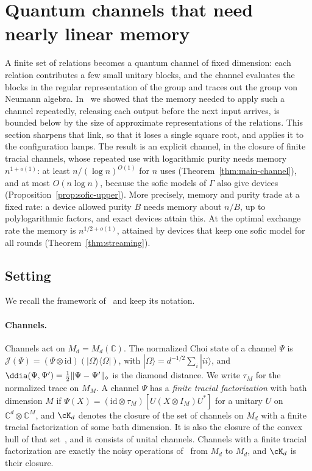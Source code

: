 \section{Quantum channels that need nearly linear memory}\label{sec:channel}

A finite set of relations becomes a quantum channel of fixed dimension: each relation contributes a few small unitary blocks, and the channel
evaluates the blocks in the regular representation of the group and traces out the group von Neumann algebra. In~\cite{DouglasMghirbiB} we showed
that the memory needed to apply such a channel repeatedly, releasing each output before the next input arrives, is bounded below by the size of
approximate representations of the relations. This section sharpens that link, so that it loses a single square root, and applies it to the
configuration lamps. The result is an explicit channel, in the closure of finite tracial channels, whose repeated use with logarithmic purity
needs memory $n^{1+o(1)}$: at least $n/(\log n)^{O(1)}$ for $n$ uses (Theorem~\ref{thm:main-channel}), and at most $O(n\log n)$, because the sofic
models of $\Gamma$ also give devices (Proposition~\ref{prop:sofic-upper}). More precisely, memory and purity trade at a fixed rate: a device
allowed purity $B$ needs memory about $n/B$, up to polylogarithmic factors, and exact devices attain this. At the optimal exchange rate the memory
is $n^{1/2+o(1)}$, attained by devices that keep one sofic model for all rounds (Theorem~\ref{thm:streaming}).

\subsection{Setting}\label{sec:channel-setting}

We recall the framework of~\cite{DouglasMghirbiB} and keep its notation.

\paragraph{Channels.} Channels act on $M_d=M_d(\mathbb C)$. The normalized Choi state of a channel $\Psi$ is
$\mathcal J(\Psi)=(\Psi\otimes\mathrm{id})(|\Omega\rangle\langle\Omega|)$, with $|\Omega\rangle=d^{-1/2}\sum_i|ii\rangle$, and
$\ddia(\Psi,\Psi')=\frac12\|\Psi-\Psi'\|_\diamond$ is the diamond distance. We write $\tau_M$ for the normalized trace on $M_M$. A channel $\Psi$ has a
\emph{finite tracial factorization} with bath dimension $M$ if $\Psi(X)=(\mathrm{id}\otimes\tau_M)[U(X\otimes I_M)U^*]$ for a unitary $U$ on
$\mathbb C^d\otimes\mathbb C^M$, and $\cK_d$ denotes the closure of the set of channels on $M_d$ with a finite tracial factorization of some bath
dimension. It is also the closure of the convex hull of that set~\cite[Proposition~3.8(ii)]{Musat2025}, and it consists of unital channels. Channels
with a finite tracial factorization are exactly the noisy operations of~\cite{HHO2003} from $M_d$ to $M_d$, and $\cK_d$ is their closure.

